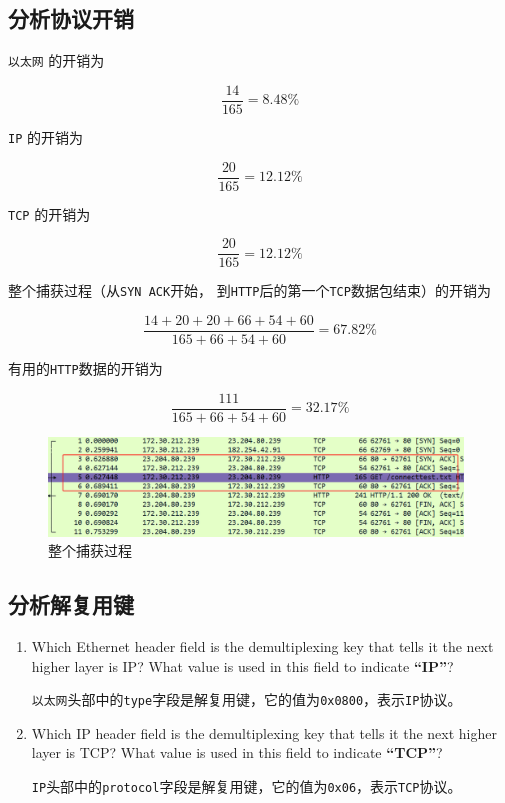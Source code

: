 \documentclass{article}
\begin{document}
	\subsection{分析协议开销}
	
	\texttt{以太网} 的开销为
	
	$$
	\frac{14}{165}=8.48\%
	$$
	
	\texttt{IP} 的开销为
	
	$$
	\frac{20}{165}=12.12\%
	$$
	
	\texttt{TCP} 的开销为
	
	$$
	\frac{20}{165}=12.12\%
	$$
	
	整个捕获过程（从\texttt{SYN ACK}开始，
	到\texttt{HTTP}后的第一个\texttt{TCP}数据包结束）的开销为
	
	$$
	\frac{14+20+20+66+54+60}{165 + 66 + 54 +60}= 67.82\%
	$$
	
	有用的\texttt{HTTP}数据的开销为
	
	$$
	\frac{111}{165 + 66 + 54 + 60}= 32.17\%
	$$
	
	\begin{figure}[H]
		\centering
		\includegraphics[width=11cm]{images/13.捕获过程.png}
		\caption{整个捕获过程}
	\end{figure}
	
	\subsection{分析解复用键}
	
	\begin{enumerate}[noitemsep]
		\item Which Ethernet header field is the demultiplexing key that tells it the next higher layer is IP? What value is used in this field to indicate \textbf{“IP”}?
		
		\texttt{以太网}头部中的\texttt{type}字段是解复用键，它的值为\texttt{0x0800}，表示\texttt{IP}协议。
		
		\item Which IP header field is the demultiplexing key that tells it the next higher layer is TCP? What value is used in this field to indicate \textbf{“TCP”}?
		
		\texttt{IP}头部中的\texttt{protocol}字段是解复用键，它的值为\texttt{0x06}，表示\texttt{TCP}协议。
		
	\end{enumerate}
	
\end{document}
